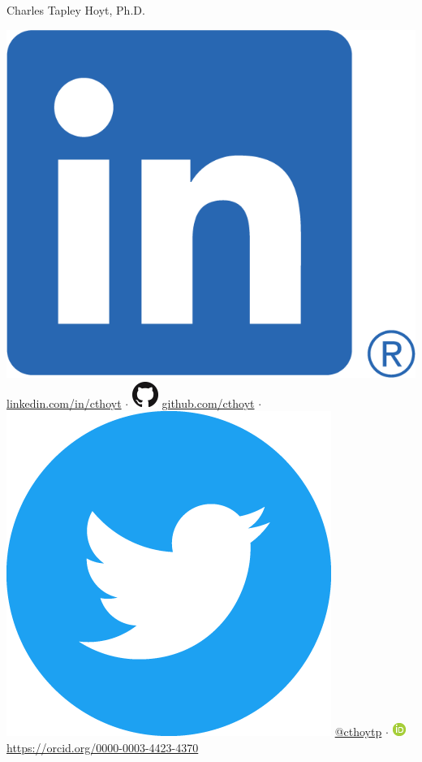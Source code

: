 \documentclass[11pt,a4paper,sans]{moderncv} %
\begin{document}
{\Huge Charles Tapley Hoyt, Ph.D.}

\vspace{3mm}

\includegraphics[scale=0.055]{img/LI-In-Bug.png}
\href{https://linkedin.com/in/cthoyt}{linkedin.com/in/cthoyt}
$\cdot$
\includegraphics[scale=0.25]{img/GitHub-Mark-32px.png}
\href{https://github.com/cthoyt}{github.com/cthoyt}
$\cdot$
\includegraphics[scale=0.02]{img/Twitter_Social_Icon_Circle_Color.png}
\href{https://twitter.com/cthoytp}{@cthoytp}
$\cdot$
\includegraphics[scale=0.5]{img/ORCIDiD_icon16x16.png}
\href{https://orcid.org/0000-0003-4423-4370}{https://orcid.org/0000-0003-4423-4370}
\end{document}

